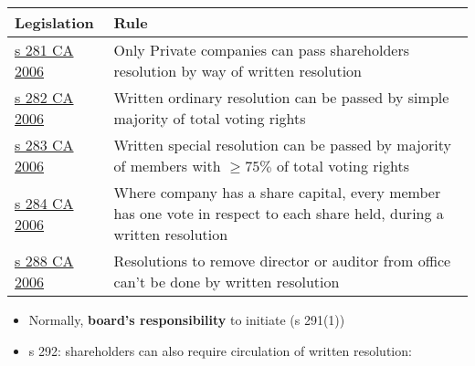 \documentclass[
]{article}
\providecommand{\tightlist}{%
  \setlength{\itemsep}{0pt}\setlength{\parskip}{0pt}}
\begin{document}
\begin{longtable}[]{@{}ll@{}}
\toprule()
Legislation & Rule \\
\midrule()
\endhead
\href{https://www.legislation.gov.uk/ukpga/2006/46/section/281}{s 281 CA
2006} & Only Private companies can pass shareholders resolution by way
of written resolution \\
\href{https://www.legislation.gov.uk/ukpga/2006/46/section/282}{s 282 CA
2006} & Written ordinary resolution can be passed by simple majority of
total voting rights \\
\href{https://www.legislation.gov.uk/ukpga/2006/46/section/283}{s 283 CA
2006} & Written special resolution can be passed by majority of members
with {\(\geq 75\%\)} of total voting rights \\
\href{https://www.legislation.gov.uk/ukpga/2006/46/section/284}{s 284 CA
2006} & Where company has a share capital, every member has one vote in
respect to each share held, during a written resolution \\
\href{https://www.legislation.gov.uk/ukpga/2006/46/section/288}{s 288 CA
2006} & Resolutions to remove director or auditor from office can't be
done by written resolution \\
\bottomrule()
\end{longtable}

\begin{itemize}
\tightlist
\item
  Normally, \textbf{board's responsibility} to initiate (s 291(1))
\item
  s 292: shareholders can also require circulation of written
  resolution:
\end{itemize}
\end{document}

